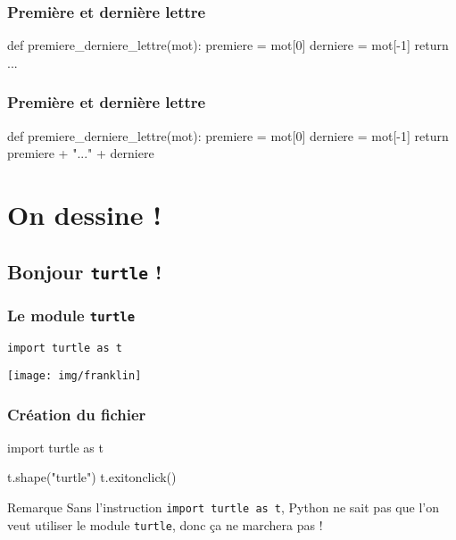 \documentclass{beamer}
\begin{document}
\begin{frame}[fragile]
   \frametitle{Première et dernière lettre}

   \begin{pyverbatim}
      def premiere_derniere_lettre(mot):
         premiere = mot[0]
         derniere = mot[-1]
         return ...
   \end{pyverbatim}
\end{frame}

\begin{frame}[fragile]
   \frametitle{Première et dernière lettre}

   \begin{pyverbatim}
      def premiere_derniere_lettre(mot):
         premiere = mot[0]
         derniere = mot[-1]
         return premiere + "..." + derniere
   \end{pyverbatim}
\end{frame}


\section{On dessine !}\label{sec:on-dessine}
   \subsection{Bonjour \texttt{turtle} !}\label{subsec:bonjour-turtle}
\begin{frame}
   \frametitle{Le module \texttt{turtle}}

   \texttt{import turtle as t}

   \begin{center}
      \texttt{[image: img/franklin]}
   \end{center}

\end{frame}

\begin{frame}[fragile]
   \frametitle{Création du fichier}

   \begin{pyverbatim}
      import turtle as t

      t.shape("turtle")
      t.exitonclick()
   \end{pyverbatim}

   \begin{block}{Remarque}
      Sans l'instruction \texttt{import turtle as t}, Python ne sait pas que l'on veut utiliser le module \texttt{turtle}, donc ça ne marchera pas !
   \end{block}
\end{frame}
\end{document}

